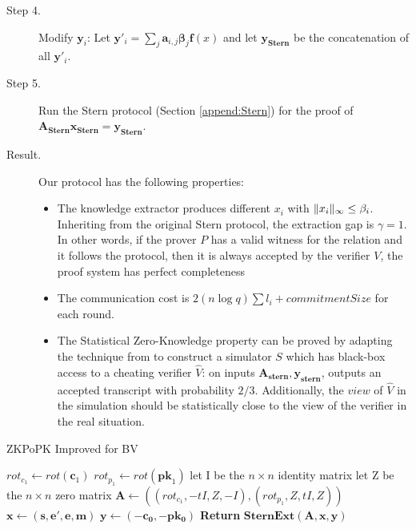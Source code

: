 \begin{description}
\item [Step 4.] Modify $\mathbf{y}_i$: Let
  $\mathbf{y}'_i = \sum_{j}\mathbf{a}_{i,j}\mathbf{\beta}_{j}\mathbf{f}(x)$ and
  let $\mathbf{y_{Stern}}$ be the concatenation of all $\mathbf{y}'_i$.


\item [Step 5.] Run the Stern protocol (Section \ref{append:Stern}) for the proof of $\mathbf{A_{Stern}x_{Stern} = y_{Stern}}$.

\item [Result.] Our protocol has the following properties:
  \begin{itemize}
  \item The knowledge extractor produces different $x_i$ with
    $\Vert x_i \Vert_{\infty} \leq \beta_i$. Inheriting from the original Stern protocol,
    the extraction gap is $\gamma = 1$. In other words, if the prover $P$ has a
    valid witness for the relation and it follows the protocol, then it is
    always accepted by the verifier $V$, the proof system has perfect
    completeness
  \item The communication cost is $2(n\log q){\sum{l_i}} + commitmentSize$ for
    each round.
  \item The Statistical Zero-Knowledge property can be proved by adapting the
    technique from \cite{stern1993new, kawachi2008concurrently} to construct a
    simulator $S$ which has black-box access to a cheating verifier $\hat{V}$:
    on inputs $\mathbf{A_{stern},y_{stern}}$, outputs an accepted transcript
    with probability $2/3$. Additionally, the $view$ of $\hat{V}$ in the
    simulation should be statistically close to the view of the verifier in the
    real situation.

  \end{itemize}

\end{description}

  \begin{algorithm}
    \caption{ZKPoPK Improved for BV}\label{alg:ZKPBVImproved}
    \begin{algorithmic}[1]
      \State $rot_{c_1} \gets rot(\mathbf{c}_1)$
      \State $rot_{p_1} \gets rot(\mathbf{pk}_1)$
      \State let I be the $n \times n$ identity matrix
      \State let Z be the $n \times n $ zero matrix
      \State $\mathbf{A} \gets ((rot_{c_1},-tI, Z, -I),(rot_{p_1}, Z, tI,Z)) $
      \State $\mathbf{x} \gets (\mathbf{s, e', e, m})$
      \State $\mathbf{y} \gets (\mathbf{-c_0, -pk_0})$
      \State \textbf{Return} $\mathbf{SternExt(A,x,y)}$
      \EndProcedure
    \end{algorithmic}
  \end{algorithm}


